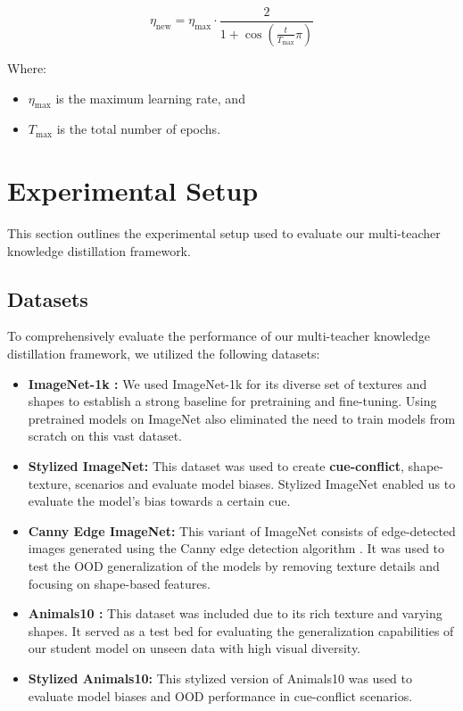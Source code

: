 \documentclass{article}
\begin{document}
\[
\eta_{\text{new}} = \eta_{\text{max}} \cdot \frac{2}{1 + \cos\left(\frac{t}{T_{\text{max}}} \pi \right)}
\]

Where:
\begin{itemize} [itemsep=0.5pt, topsep=1pt]
    \item \( \eta_{\text{max}} \) is the maximum learning rate, and
    \item \( T_{\text{max}} \) is the total number of epochs.
\end{itemize}

\section{Experimental Setup}
This section outlines the experimental setup used to evaluate our multi-teacher knowledge distillation
framework.

\subsection{Datasets}
To comprehensively evaluate the performance of our multi-teacher knowledge distillation framework, we utilized the following datasets: \\

\begin{itemize}[noitemsep, topsep=0pt]
    \item \textbf{ImageNet-1k \cite{deng2009imagenet}:} We used ImageNet-1k for its diverse set of textures and shapes to establish a strong baseline for pretraining and fine-tuning. Using pretrained models on ImageNet also eliminated the need to train models from scratch on this vast dataset.

    \item \textbf{Stylized ImageNet\cite{geirhos2018imagenet}:} This dataset was used to create \textbf{cue-conflict}, shape-texture, scenarios and evaluate model biases. Stylized ImageNet enabled us to evaluate the model's bias towards a certain cue.

    \item \textbf{Canny Edge ImageNet:} This variant of ImageNet consists of edge-detected images generated using the Canny edge detection algorithm . It was used to test the OOD generalization of the models by removing texture details and focusing on shape-based features.

    \item \textbf{Animals10 \cite{berg2006animals}:} This dataset was included due to its rich texture and varying shapes. It served as a test bed for evaluating the generalization capabilities of our student model on unseen data with high visual diversity.

    \item \textbf{Stylized Animals10:} This stylized version of Animals10 was used to evaluate model biases and OOD performance in cue-conflict scenarios.
\end{itemize}
\end{document}
